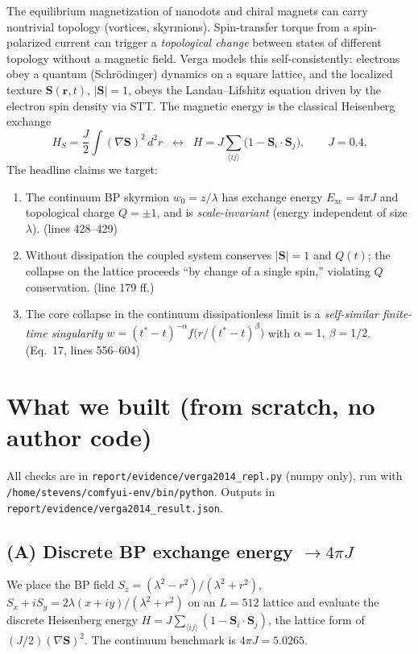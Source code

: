 \documentclass[11pt]{article}
\begin{document}
The equilibrium magnetization of nanodots and chiral magnets can carry nontrivial
topology (vortices, skyrmions). Spin-transfer torque from a spin-polarized current
can trigger a \emph{topological change} between states of different topology
without a magnetic field. Verga models this self-consistently: electrons obey a
quantum (Schr\"odinger) dynamics on a square lattice, and the localized texture
$\mathbf S(\mathbf r,t)$, $|\mathbf S|=1$, obeys the Landau--Lifshitz equation
driven by the electron spin density via STT. The magnetic energy is the classical
Heisenberg exchange
\begin{equation}
H_S=\frac{J}{2}\int(\nabla\mathbf S)^2\,d^2r
\;\;\longleftrightarrow\;\;
H=J\!\!\sum_{\langle ij\rangle}\!\bigl(1-\mathbf S_i\!\cdot\!\mathbf S_j\bigr),
\qquad J=0.4 .
\end{equation}
The headline claims we target:
\begin{enumerate}
\item The continuum BP skyrmion $w_0=z/\lambda$ has exchange energy
      $E_{\mathrm{xc}}=4\pi J$ and topological charge $Q=\pm1$, and is
      \emph{scale-invariant} (energy independent of size $\lambda$). (lines 428--429)
\item Without dissipation the coupled system conserves $|\mathbf S|=1$ and $Q(t)$;
      the collapse on the lattice proceeds ``by change of a single spin,'' violating
      $Q$ conservation. (line 179 ff.)
\item The core collapse in the continuum dissipationless limit is a
      \emph{self-similar finite-time singularity}
      $w=(t^*-t)^{-\alpha}f\!\big(r/(t^*-t)^{\beta}\big)$ with
      $\alpha=1,\ \beta=1/2$. (Eq.~17, lines 556--604)
\end{enumerate}

\section{What we built (from scratch, no author code)}

All checks are in \texttt{report/evidence/verga2014\_repl.py} (numpy only), run
with \texttt{/home/stevens/comfyui-env/bin/python}. Outputs in
\texttt{report/evidence/verga2014\_result.json}.

\subsection{(A) Discrete BP exchange energy $\to 4\pi J$}
We place the BP field
$S_z=(\lambda^2-r^2)/(\lambda^2+r^2)$,
$S_x+iS_y=2\lambda(x+iy)/(\lambda^2+r^2)$
on an $L=512$ lattice and evaluate the discrete Heisenberg energy
$H=J\sum_{\langle ij\rangle}(1-\mathbf S_i\!\cdot\!\mathbf S_j)$, the lattice form
of $(J/2)(\nabla\mathbf S)^2$. The continuum benchmark is $4\pi J=5.0265$.
\end{document}
